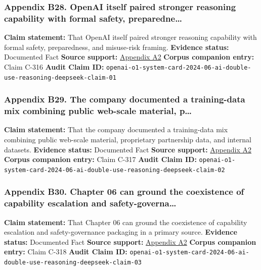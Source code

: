 \documentclass[
  american,
  11pt,
  letterpaper,
]{article}
\begin{document}
\subsubsection{Appendix B28. OpenAI itself paired stronger reasoning
capability with formal safety,
preparedne\ldots{}}\label{ch-06-appendix-b28-openai-itself-paired-stronger-reasoning-capability-with-formal-safety-preparedne}

\textbf{Claim statement:} That OpenAI itself paired stronger reasoning
capability with formal safety, preparedness, and misuse-risk framing.
\textbf{Evidence status:} Documented Fact \textbf{Source support:}
\hyperref[ch-06-appendix-a2-openai-o1-system-card]{Appendix A2}
\textbf{Corpus companion entry:} Claim C-316 \textbf{Audit Claim ID:}
\texttt{openai-o1-system-card-2024-06-ai-double-use-reasoning-deepseek-claim-01}

\subsubsection{Appendix B29. The company documented a training-data mix
combining public web-scale material,
p\ldots{}}\label{ch-06-appendix-b29-the-company-documented-a-training-data-mix-combining-public-web-scale-material-p}

\textbf{Claim statement:} That the company documented a training-data
mix combining public web-scale material, proprietary partnership data,
and internal datasets. \textbf{Evidence status:} Documented Fact
\textbf{Source support:}
\hyperref[ch-06-appendix-a2-openai-o1-system-card]{Appendix A2}
\textbf{Corpus companion entry:} Claim C-317 \textbf{Audit Claim ID:}
\texttt{openai-o1-system-card-2024-06-ai-double-use-reasoning-deepseek-claim-02}

\subsubsection{Appendix B30. Chapter 06 can ground the coexistence of
capability escalation and
safety-governa\ldots{}}\label{ch-06-appendix-b30-chapter-06-can-ground-the-coexistence-of-capability-escalation-and-safety-governa}

\textbf{Claim statement:} That Chapter 06 can ground the coexistence of
capability escalation and safety-governance packaging in a primary
source. \textbf{Evidence status:} Documented Fact \textbf{Source
support:} \hyperref[ch-06-appendix-a2-openai-o1-system-card]{Appendix
A2} \textbf{Corpus companion entry:} Claim C-318 \textbf{Audit Claim
ID:}
\texttt{openai-o1-system-card-2024-06-ai-double-use-reasoning-deepseek-claim-03}
\end{document}
